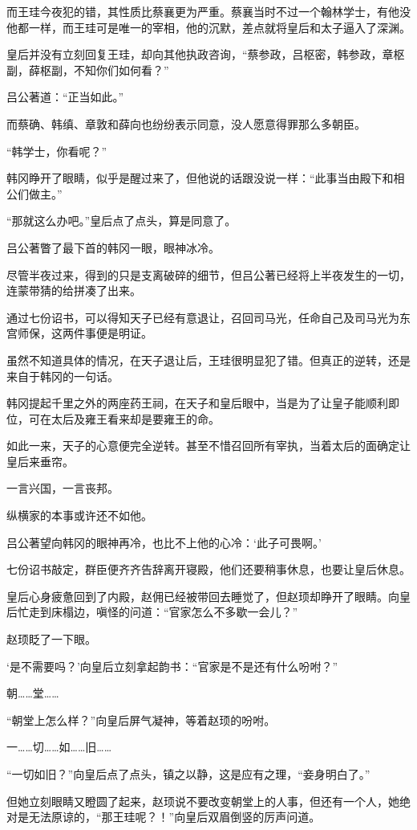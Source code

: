 而王珪今夜犯的错，其性质比蔡襄更为严重。蔡襄当时不过一个翰林学士，有他没他都一样，而王珪可是唯一的宰相，他的沉默，差点就将皇后和太子逼入了深渊。

皇后并没有立刻回复王珪，却向其他执政咨询，“蔡参政，吕枢密，韩参政，章枢副，薛枢副，不知你们如何看？”

吕公著道：“正当如此。”

而蔡确、韩缜、章敦和薛向也纷纷表示同意，没人愿意得罪那么多朝臣。

“韩学士，你看呢？”

韩冈睁开了眼睛，似乎是醒过来了，但他说的话跟没说一样：“此事当由殿下和相公们做主。”

“那就这么办吧。”皇后点了点头，算是同意了。

吕公著瞥了最下首的韩冈一眼，眼神冰冷。

尽管半夜过来，得到的只是支离破碎的细节，但吕公著已经将上半夜发生的一切，连蒙带猜的给拼凑了出来。

通过七份诏书，可以得知天子已经有意退让，召回司马光，任命自己及司马光为东宫师保，这两件事便是明证。

虽然不知道具体的情况，在天子退让后，王珪很明显犯了错。但真正的逆转，还是来自于韩冈的一句话。

韩冈提起千里之外的两座药王祠，在天子和皇后眼中，当是为了让皇子能顺利即位，可在太后及雍王看来却是要雍王的命。

如此一来，天子的心意便完全逆转。甚至不惜召回所有宰执，当着太后的面确定让皇后来垂帘。

一言兴国，一言丧邦。

纵横家的本事或许还不如他。

吕公著望向韩冈的眼神再冷，也比不上他的心冷：‘此子可畏啊。’

七份诏书敲定，群臣便齐齐告辞离开寝殿，他们还要稍事休息，也要让皇后休息。

皇后心身疲惫回到了内殿，赵佣已经被带回去睡觉了，但赵顼却睁开了眼睛。向皇后忙走到床榻边，嗔怪的问道：“官家怎么不多歇一会儿？”

赵顼眨了一下眼。

‘是不需要吗？’向皇后立刻拿起韵书：“官家是不是还有什么吩咐？”

朝……堂……

“朝堂上怎么样？”向皇后屏气凝神，等着赵顼的吩咐。

一……切……如……旧……

“一切如旧？”向皇后点了点头，镇之以静，这是应有之理，“妾身明白了。”

但她立刻眼睛又瞪圆了起来，赵顼说不要改变朝堂上的人事，但还有一个人，她绝对是无法原谅的，“那王珪呢？！”向皇后双眉倒竖的厉声问道。

